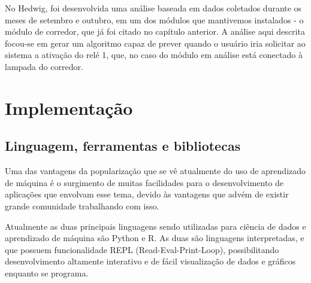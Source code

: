 		No Hedwig, foi desenvolvida uma análise baseada em dados coletados durante os meses de setembro e outubro, em um dos módulos que mantivemos instalados - o módulo de corredor, que já foi citado no capítulo anterior. A análise aqui descrita focou-se em gerar um algoritmo capaz de prever quando o usuário iria solicitar ao sistema a ativação do relé 1, que, no caso do módulo em análise está conectado à lampada do corredor.



	\section{Implementação}

		\subsection{Linguagem, ferramentas e bibliotecas}

			Uma das vantagens da popularização que se vê atualmente do uso de aprendizado de máquina é o surgimento de muitas facilidades para o desenvolvimento de aplicações que envolvam esse tema, devido às vantagens que advém de existir grande comunidade trabalhando com isso.

			Atualmente as duas principais linguagens sendo utilizadas para ciência de dados e aprendizado de máquina são Python e R. As duas são linguagens interpretadas, e que possuem funcionalidade REPL (Read-Eval-Print-Loop), possibilitando desenvolvimento altamente interativo e de fácil visualização de dados e gráficos enquanto se programa.

